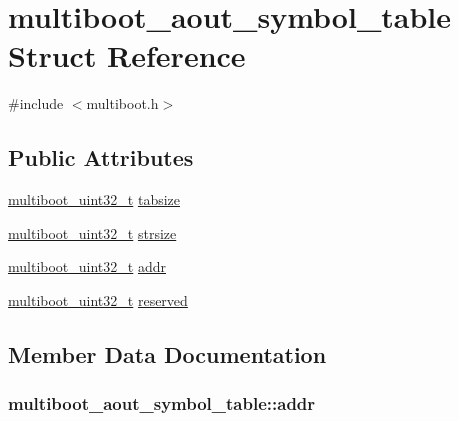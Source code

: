 \hypertarget{structmultiboot__aout__symbol__table}{}\section{multiboot\+\_\+aout\+\_\+symbol\+\_\+table Struct Reference}
\label{structmultiboot__aout__symbol__table}


{\ttfamily \#include $<$multiboot.\+h$>$}

\subsection*{Public Attributes}
\begin{DoxyCompactItemize}
\item 
\hyperlink{multiboot_8h_a009f355da41fed4badb8a52d432f5186}{multiboot\+\_\+uint32\+\_\+t} \hyperlink{structmultiboot__aout__symbol__table_a3c9cc58c068678c095a7695f74375ca2}{tabsize}
\item 
\hyperlink{multiboot_8h_a009f355da41fed4badb8a52d432f5186}{multiboot\+\_\+uint32\+\_\+t} \hyperlink{structmultiboot__aout__symbol__table_af9876cbe1b37935ed039c855f04b760e}{strsize}
\item 
\hyperlink{multiboot_8h_a009f355da41fed4badb8a52d432f5186}{multiboot\+\_\+uint32\+\_\+t} \hyperlink{structmultiboot__aout__symbol__table_ab399f68a251079409489149a5d48033f}{addr}
\item 
\hyperlink{multiboot_8h_a009f355da41fed4badb8a52d432f5186}{multiboot\+\_\+uint32\+\_\+t} \hyperlink{structmultiboot__aout__symbol__table_a2317e4e566e417b8fb3502074e0807d7}{reserved}
\end{DoxyCompactItemize}


\subsection{Member Data Documentation}
\hypertarget{structmultiboot__aout__symbol__table_ab399f68a251079409489149a5d48033f}{}
\subsubsection[{addr}]{ multiboot\+\_\+aout\+\_\+symbol\+\_\+table\+::addr}\label{structmultiboot__aout__symbol__table_ab399f68a251079409489149a5d48033f}
\hypertarget{structmultiboot__aout__symbol__table_a2317e4e566e417b8fb3502074e0807d7}{}
